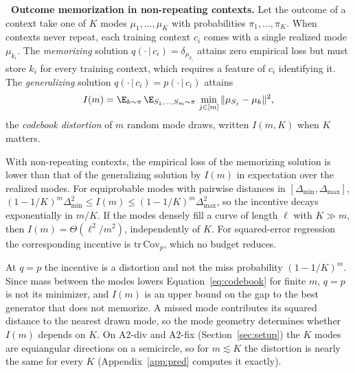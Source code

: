 \leavevmode{}\textbf{\thesubsection\ Outcome memorization in non-repeating contexts.}
\label{sec:theory_memo}
Let the outcome of a context take one of $K$ modes $\mu_1, \dots, \mu_K$ with probabilities $\pi_1, \dots, \pi_K$. When contexts never repeat, each training context $c_i$ comes with a single realized mode $\mu_{k_i}$. The \emph{memorizing} solution $q(\cdot\,|\,c_i) = \delta_{\mu_{k_i}}$ attains zero empirical loss but must store $k_i$ for every training context, which requires a feature of $c_i$ identifying it. The \emph{generalizing} solution $q(\cdot\,|\,c_i) = p(\cdot\,|\,c_i)$ attains
\begin{equation}
I(m) = \E_{k \sim \pi}\, \E_{S_1,\dots,S_m \sim \pi}\, \min_{j \in [m]} \| \mu_{S_j} - \mu_k \|^2 ,
\label{eq:I}
\end{equation}
the \emph{codebook distortion} of $m$ random mode draws, written $I(m,K)$ when $K$ matters.
\begin{proposition}
\label{prop:memo}
With non-repeating contexts, the empirical \nom{} loss of the memorizing solution is lower than that of the generalizing solution by $I(m)$ in expectation over the realized modes. For equiprobable modes with pairwise distances in $[\Delta_{\min}, \Delta_{\max}]$, $(1 - 1/K)^m \Delta_{\min}^2 \le I(m) \le (1-1/K)^m \Delta_{\max}^2$, so the incentive decays exponentially in $m/K$. If the modes densely fill a curve of length $\ell$ with $K \gg m$, then $I(m) = \Theta(\ell^2/m^2)$, independently of $K$. For squared-error regression the corresponding incentive is $\mathrm{tr}\,\mathrm{Cov}_p$, which no budget reduces.
\end{proposition}
At $q = p$ the incentive is a distortion and not the miss probability $(1-1/K)^m$. Since mass between the modes lowers Equation~\ref{eq:codebook} for finite $m$, $q = p$ is not its minimizer, and $I(m)$ is an upper bound on the gap to the best generator that does not memorize. A missed mode contributes its squared distance to the nearest drawn mode, so the mode geometry determines whether $I(m)$ depends on $K$. On A2-div and A2-fix (Section~\ref{sec:setup}) the $K$ modes are equiangular directions on a semicircle, so for $m \lesssim K$ the distortion is nearly the same for every $K$ (Appendix~\ref{app:pred} computes it exactly).

